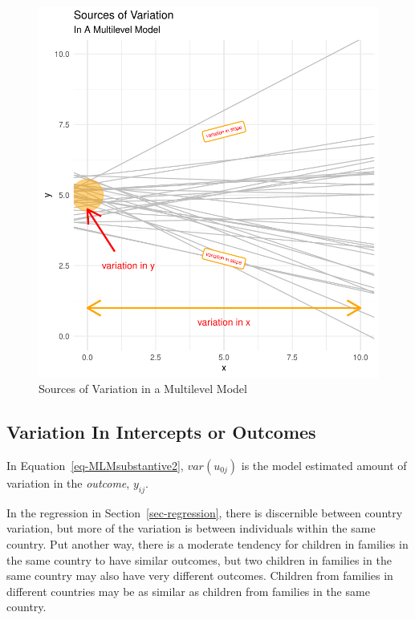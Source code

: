 \documentclass[
  letterpaper,
  DIV=11,
  numbers=noendperiod]{scrreprt}
\begin{document}
\begin{figure}

{\centering \includegraphics{./cross-sectional_files/figure-pdf/fig-variationsources-1.pdf}

}

\caption{\label{fig-variationsources}Sources of Variation in a
Multilevel Model}

\end{figure}

\hypertarget{variation-in-intercepts-or-outcomes}{%
\subsection{Variation In Intercepts or
Outcomes}\label{variation-in-intercepts-or-outcomes}}

In Equation~\ref{eq-MLMsubstantive2}, \(var(u_{0j})\) is the model
estimated amount of variation in the \emph{outcome}, \(y_{ij}\).

In the regression in Section~\ref{sec-regression}, there is discernible
between country variation, but more of the variation is between
individuals within the same country. Put another way, there is a
moderate tendency for children in families in the same country to have
similar outcomes, but two children in families in the same country may
also have very different outcomes. Children from families in different
countries may be as similar as children from families in the same
country.
\end{document}
